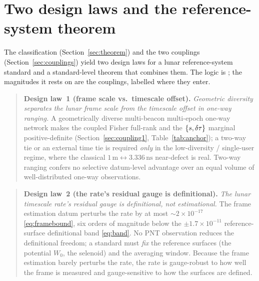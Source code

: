 \section{Two design laws and the reference-system theorem}
\label{sec:designlaws}

The classification (Section~\ref{sec:theorem}) and the two couplings
(Section~\ref{sec:couplings}) yield two design laws for a lunar reference-system standard
and a standard-level theorem that combines them. The logic is \Proven{}; the magnitudes it
rests on are the \Modelled{} couplings, labelled where they enter.

\begin{quote}
\textbf{Design law~1 (frame scale vs.\ timescale offset).} \emph{Geometric diversity
separates the lunar frame scale from the timescale offset in one-way ranging.} A
geometrically diverse multi-beacon multi-epoch one-way network makes the coupled Fisher
full-rank and the $\{s,\delta\tau\}$ marginal positive-definite (Section~\ref{sec:coupling1},
Table~\ref{tab:anchor}); a two-way tie or an external time tie is required \emph{only} in
the low-diversity / single-user regime, where the classical
$1\,\text{m}\leftrightarrow3.336\,\text{ns}$ near-defect is real. Two-way ranging confers no
selective datum-level advantage over an equal volume of well-distributed one-way
observations.
\end{quote}

\begin{quote}
\textbf{Design law~2 (the rate's residual gauge is definitional).} \emph{The lunar
timescale rate's residual gauge is definitional, not estimational.} The frame estimation
datum perturbs the rate by at most $\sim2\times10^{-17}$
\eqref{eq:framebound}, six orders of magnitude below the $\pm1.7\times10^{-11}$
reference-surface definitional band \eqref{eq:band}. No PNT observation reduces the
definitional freedom; a standard must \emph{fix} the reference surfaces (the potential
$W_0$, the selenoid) and the averaging window. Because the frame estimation barely perturbs
the rate, the rate is gauge-robust to how well the frame is measured and gauge-sensitive to
how the surfaces are defined.
\end{quote}


